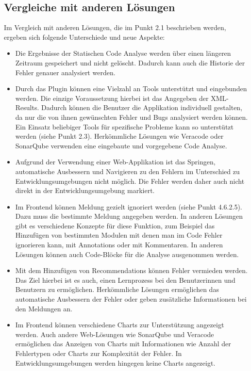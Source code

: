 \subsection{Vergleiche mit anderen Lösungen} 
Im Vergleich mit anderen Lösungen, die im Punkt 2.1 beschrieben werden, ergeben sich folgende Unterschiede und neue Aspekte: 
\begin{itemize}
\item Die Ergebnisse der Statischen Code Analyse werden über einen längeren Zeitraum gespeichert und nicht gelöscht. Dadurch kann auch die Historie der Fehler genauer analysiert werden. 
\item Durch das Plugin können eine Vielzahl an Tools unterstützt und eingebunden werden. Die einzige Voraussetzung hierbei ist das Angegeben der XML-Results. Dadurch können die Benutzer die Applikation individuell gestalten, da nur die von ihnen gewünschten Fehler und Bugs analysiert werden können. Ein Einsatz beliebiger Tools für spezifische Probleme kann so unterstützt werden (siehe Punkt 2.3). Herkömmliche Lösungen wie Veracode oder SonarQube verwenden eine eingebaute und vorgegebene Code Analyse.
\item Aufgrund der Verwendung einer Web-Applikation ist das Springen, automatische Ausbessern und Navigieren zu den Fehlern im Unterschied zu Entwicklungsumgebungen nicht möglich. Die Fehler werden daher auch nicht direkt in der Entwicklungsumgebung markiert.
\item Im Frontend können Meldung gezielt ignoriert werden (siehe Punkt 4.6.2.5). Dazu muss die bestimmte Meldung angegeben werden. In anderen Lösungen gibt es verschiedene Konzepte für diese Funktion, zum Beispiel das Hinzufügen von bestimmten Modulen mit denen man im Code Fehler ignorieren kann, mit Annotations oder mit Kommentaren. In anderen Lösungen können auch Code-Blöcke für die Analyse ausgenommen werden.
\item Mit dem Hinzufügen von Recommendations können Fehler vermieden werden. Das Ziel hierbei ist es auch, einen Lernprozess bei den Benutzerinnen und Benutzern zu ermöglichen. Herkömmliche Lösungen ermöglichen das automatische Ausbessern der Fehler oder geben zusätzliche  Informationen bei den Meldungen an.
\item Im Frontend können verschiedene Charts zur Unterstützung angezeigt werden. Auch andere Web-Lösungen wie SonarQube und Veracode ermöglichen das Anzeigen von Charts mit Informationen wie Anzahl der Fehlertypen oder Charts zur Komplexität der Fehler. In Entwicklungsumgebungen werden hingegen keine Charts angezeigt.
\end{itemize}
